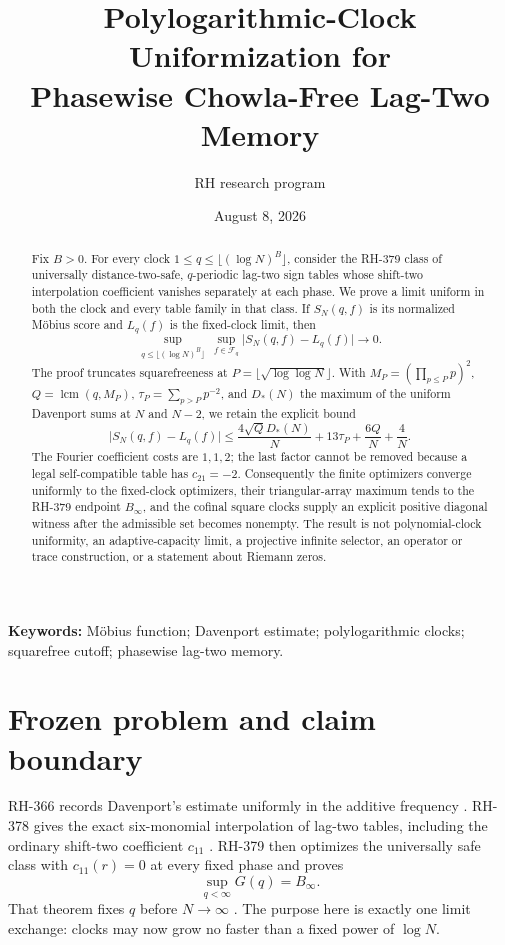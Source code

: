 \documentclass[11pt]{article}
\title{Polylogarithmic-Clock Uniformization for\\
Phasewise Chowla-Free Lag-Two Memory}
\author{RH research program}
\date{August 8, 2026}
\theoremstyle{definition}
\theoremstyle{remark}
\newcommand{\Fcal}{\mathcal F}
\newcommand{\abs}[1]{\lvert#1\rvert}
\begin{document}
\maketitle

\begin{abstract}
Fix $B>0$.  For every clock
$1\le q\le\lfloor(\log N)^B\rfloor$, consider the RH-379 class of
universally distance-two-safe, $q$-periodic lag-two sign tables whose
shift-two interpolation coefficient vanishes separately at each phase.
We prove a limit uniform in both the clock and every table family in that
class.  If $S_N(q,f)$ is its normalized M\"obius score and $L_q(f)$ is the
fixed-clock limit, then
\[
 \sup_{q\le\lfloor(\log N)^B\rfloor}\ \sup_{f\in\Fcal_q}
       \abs{S_N(q,f)-L_q(f)}\longrightarrow0.
\]
The proof truncates squarefreeness at
$P=\lfloor\sqrt{\log\log N}\rfloor$.  With
$M_P=(\prod_{p\le P}p)^2$, $Q=\operatorname{lcm}(q,M_P)$,
$\tau_P=\sum_{p>P}p^{-2}$, and $D_*(N)$ the maximum of the uniform
Davenport sums at $N$ and $N-2$, we retain the explicit bound
\[
 \abs{S_N(q,f)-L_q(f)}
 \le \frac{4\sqrt QD_*(N)}{N}+13\tau_P+\frac{6Q}{N}+\frac4N.
\]
The Fourier coefficient costs are $1,1,2$; the last factor cannot be
removed because a legal self-compatible table has $c_{21}=-2$.
Consequently the finite optimizers converge uniformly to the fixed-clock
optimizers, their triangular-array maximum tends to the RH-379 endpoint
$B_\infty$, and the cofinal square clocks supply an explicit positive
diagonal witness after the admissible set becomes nonempty.  The result is
not polynomial-clock uniformity, an adaptive-capacity limit, a projective
infinite selector, an operator or trace construction, or a statement about
Riemann zeros.
\end{abstract}

\noindent\textbf{Keywords:} M\"obius function; Davenport estimate;
polylogarithmic clocks; squarefree cutoff; phasewise lag-two memory.

\section{Frozen problem and claim boundary}

RH-366 records Davenport's estimate uniformly in the additive frequency
\cite{Davenport1937,IwaniecKowalski2004,RH366}.  RH-378 gives the exact
six-monomial interpolation of lag-two tables, including the ordinary
shift-two coefficient $c_{11}$ \cite{RH378}.  RH-379 then optimizes the
universally safe class with $c_{11}(r)=0$ at every fixed phase and proves
\begin{equation}
                         \sup_{q<\infty}G(q)=B_\infty.
 \label{eq:rh379-supremum}
\end{equation}
That theorem fixes $q$ before $N\to\infty$ \cite{RH379}.  The purpose here
is exactly one limit exchange: clocks may now grow no faster than a fixed
power of $\log N$.
\end{document}
